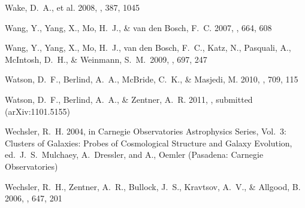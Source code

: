 \documentclass[]{emulateapj}
\begin{document}
\begin{thebibliography}{999}

Wake, D.\ A., et al. 2008,
\mnras, 387, 1045



Wang, Y., Yang, X., Mo, H.\ J., \& van den Bosch, F.\ C. 2007,
\apj, 664, 608

Wang, Y., Yang, X., Mo, H.~J., van den Bosch, F.~C., Katz, N., Pasquali, 
A., McIntosh, D.~H., \& Weinmann, S.~M.\ 2009, \apj, 697, 247 

Watson, D.~F., Berlind, A.~A., McBride, C.~K.,
\& Masjedi, M. 2010, \apj, 709, 115

Watson, D.~F., Berlind, A.~A., \& Zentner, A.~R. 2011, \apj,
submitted (arXiv:1101.5155)

Wechsler, R.\ H. 2004, in Carnegie Observatories Astrophysics Series,
Vol.\ 3: Clusters of Galaxies: Probes of Cosmological Structure and 
Galaxy Evolution, ed.\ J.\ S.\ Mulchaey, A.\ Dressler, and A., Oemler
(Pasadena: Carnegie Observatories)

Wechsler, R.\ H., Zentner, A.\ R., Bullock, J.\ S., Kravtsov, A.\ V., \& 
Allgood, B. 2006, \apj, 647, 201 



\end{thebibliography}
\end{document}
